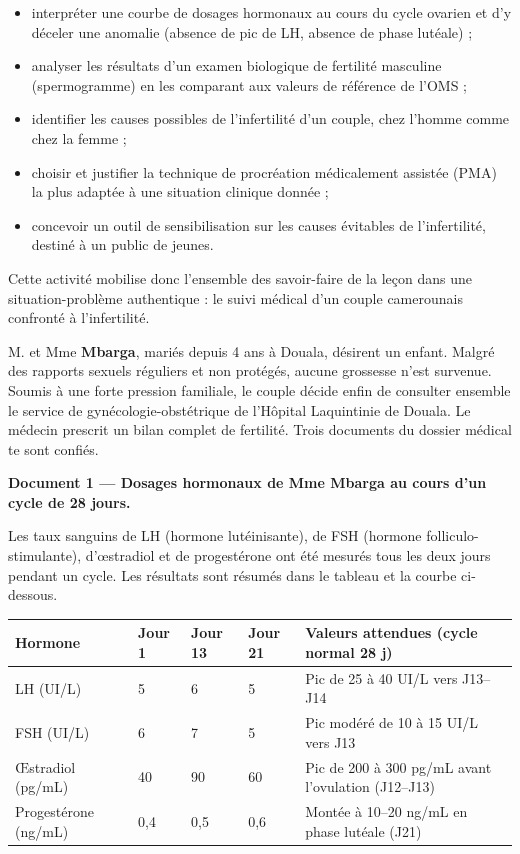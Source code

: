 \documentclass[11pt]{article}
\newcommand{\cle}[1]{{\popxbold\color{popdark}#1}}
\newcounter{popsec}
\newcounter{popsub}
\newcommand{\courssub}[1]{%
  \stepcounter{popsub}%
  \par\vspace{9pt}\noindent{\popxbold\fontsize{11.5}{13}\selectfont\color{popink}{\color{poporange}\thepopsec.\thepopsub}\hspace{6pt}#1}\par\nopagebreak\vspace{4pt}
}
\begin{document}
\begin{itemize}
\item \cle{interpréter} une courbe de dosages hormonaux au cours du cycle ovarien et d'y déceler une anomalie (absence de pic de LH, absence de phase lutéale) ;
\item \cle{analyser} les résultats d'un examen biologique de fertilité masculine (spermogramme) en les comparant aux valeurs de référence de l'OMS ;
\item \cle{identifier} les causes possibles de l'infertilité d'un couple, chez l'homme comme chez la femme ;
\item \cle{choisir} et \cle{justifier} la technique de procréation médicalement assistée (PMA) la plus adaptée à une situation clinique donnée ;
\item \cle{concevoir} un outil de sensibilisation sur les causes évitables de l'infertilité, destiné à un public de jeunes.
\end{itemize}

Cette activité mobilise donc l'ensemble des savoir-faire de la leçon dans une \cle{situation-problème authentique} : le suivi médical d'un couple camerounais confronté à l'infertilité.

\courssub{Situation}

M. et Mme \textbf{Mbarga}, mariés depuis 4 ans à Douala, désirent un enfant. Malgré des rapports sexuels réguliers et non protégés, aucune grossesse n'est survenue. Soumis à une forte pression familiale, le couple décide enfin de consulter ensemble le service de gynécologie-obstétrique de l'Hôpital Laquintinie de Douala. Le médecin prescrit un bilan complet de fertilité. Trois documents du dossier médical te sont confiés.

\textbf{Document 1 — Dosages hormonaux de Mme Mbarga au cours d'un cycle de 28 jours.}

Les taux sanguins de LH (hormone lutéinisante), de FSH (hormone folliculo-stimulante), d'{\oe}stradiol et de progestérone ont été mesurés tous les deux jours pendant un cycle. Les résultats sont résumés dans le tableau et la courbe ci-dessous.

\begin{center}
\begin{tabularx}{\linewidth}{|l|X|X|X|X|}
\hline
\rowcolor{popblueL} \textbf{Hormone} & \textbf{Jour 1} & \textbf{Jour 13} & \textbf{Jour 21} & \textbf{Valeurs attendues (cycle normal 28 j)} \\
\hline
LH (UI/L) & 5 & 6 & 5 & Pic de 25 à 40 UI/L vers J13--J14 \\
\hline
FSH (UI/L) & 6 & 7 & 5 & Pic modéré de 10 à 15 UI/L vers J13 \\
\hline
{\OE}stradiol (pg/mL) & 40 & 90 & 60 & Pic de 200 à 300 pg/mL avant l'ovulation (J12--J13) \\
\hline
Progestérone (ng/mL) & 0,4 & 0,5 & 0,6 & Montée à 10--20 ng/mL en phase lutéale (J21) \\
\hline
\end{tabularx}
\end{center}
\end{document}
